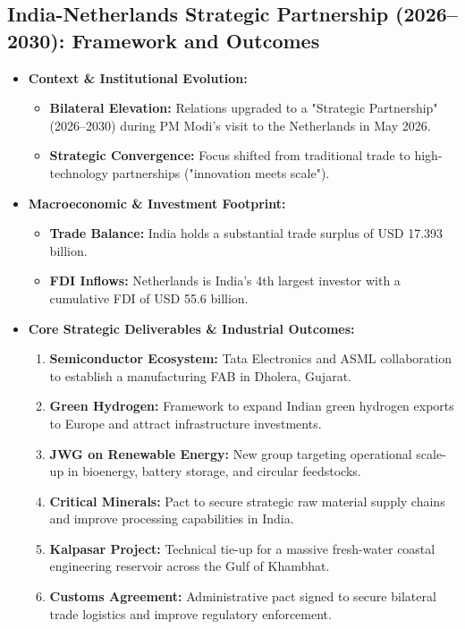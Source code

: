\subsection{India-Netherlands Strategic Partnership (2026--2030): Framework and Outcomes}
\begin{itemize}
    \item \textbf{Context \& Institutional Evolution:}
    \begin{itemize}
        \item \textbf{Bilateral Elevation:} Relations upgraded to a "Strategic Partnership" (2026--2030) during PM Modi's visit to the Netherlands in May 2026.
        \item \textbf{Strategic Convergence:} Focus shifted from traditional trade to high-technology partnerships ("innovation meets scale").
    \end{itemize}

    \item \textbf{Macroeconomic \& Investment Footprint:}
    \begin{itemize}
        \item \textbf{Trade Balance:} India holds a substantial trade surplus of USD 17.393 billion.
        \item \textbf{FDI Inflows:} Netherlands is India’s 4th largest investor with a cumulative FDI of USD 55.6 billion.
    \end{itemize}

    \item \textbf{Core Strategic Deliverables \& Industrial Outcomes:}
    \begin{enumerate}
        \item \textbf{Semiconductor Ecosystem:} Tata Electronics and ASML collaboration to establish a manufacturing FAB in Dholera, Gujarat.
        \item \textbf{Green Hydrogen:} Framework to expand Indian green hydrogen exports to Europe and attract infrastructure investments.
        \item \textbf{JWG on Renewable Energy:} New group targeting operational scale-up in bioenergy, battery storage, and circular feedstocks.
        \item \textbf{Critical Minerals:} Pact to secure strategic raw material supply chains and improve processing capabilities in India.
        \item \textbf{Kalpasar Project:} Technical tie-up for a massive fresh-water coastal engineering reservoir across the Gulf of Khambhat.
        \item \textbf{Customs Agreement:} Administrative pact signed to secure bilateral trade logistics and improve regulatory enforcement.
    \end{enumerate}


\end{itemize}
